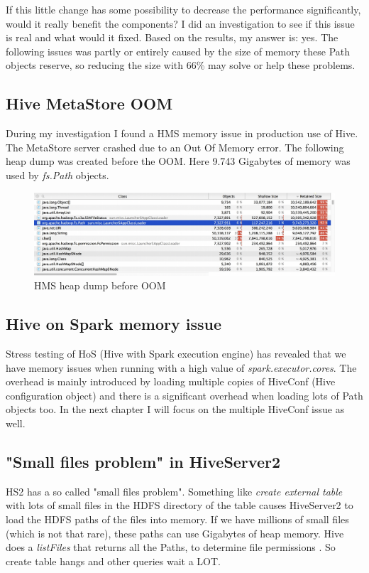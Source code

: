 If this little change has some possibility to decrease the performance significantly, would it really benefit the components? I did an investigation to see if this issue is real and what would it fixed. Based on the results, my answer is: yes. The following issues was partly or entirely caused by the size of memory these Path objects reserve, so reducing the size with 66\% may solve or help these problems.

\subsection{Hive MetaStore OOM}
During my investigation I found a HMS memory issue in production use of Hive. The MetaStore server crashed due to an Out Of Memory error. The following heap dump was created before the OOM. Here 9.743 Gigabytes of memory was used by \textit{fs.Path} objects.

\begin{figure}[H]
	\includegraphics[width=150mm, keepaspectratio]{figures/hms_heapdump.png}
	\centering
	\caption{HMS heap dump before OOM}
\end{figure}

\subsection{Hive on Spark memory issue}
Stress testing of HoS (Hive with Spark execution engine) has revealed that we have memory issues when running with a high value of \textit{spark.executor.cores}. The overhead is mainly introduced by loading multiple copies of HiveConf (Hive configuration object) and there is a significant overhead when loading lots of Path objects too. In the next chapter I will focus on the multiple HiveConf issue as well.

\subsection{"Small files problem" in HiveServer2}
HS2 has a so called "small files problem". Something like \textit{create external table} with lots of small files in the  HDFS directory of the table causes HiveServer2 to load the HDFS paths of the files into memory. If we have millions of small files (which is not that rare), these paths can use Gigabytes of heap memory. Hive does a \textit{listFiles} that returns all the Paths, to determine file permissions \etc. So create table hangs and other queries wait a LOT.

